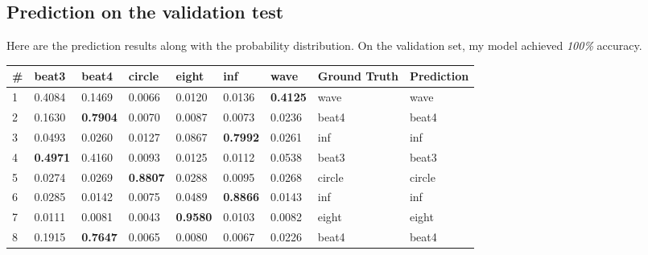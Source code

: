 \documentclass[english]{article}
\begin{document}
\subsection {Prediction on the validation test}
Here are the prediction results along with the probability distribution. On the validation set, my model achieved \emph{100\%} accuracy.\\
\begin{tabular}{|l|l|l|l|l|l|l|l|l|}
\hline
\# & beat3           & beat4           & circle          & eight           & inf             & wave            & Ground Truth & Prediction \\ \hline
1  & 0.4084          & 0.1469          & 0.0066          & 0.0120          & 0.0136          & \textbf{0.4125} & wave         & wave       \\ \hline
2  & 0.1630          & \textbf{0.7904} & 0.0070          & 0.0087          & 0.0073          & 0.0236          & beat4        & beat4      \\ \hline
3  & 0.0493          & 0.0260          & 0.0127          & 0.0867          & \textbf{0.7992} & 0.0261          & inf          & inf        \\ \hline
4  & \textbf{0.4971} & 0.4160          & 0.0093          & 0.0125          & 0.0112          & 0.0538          & beat3        & beat3      \\ \hline
5  & 0.0274          & 0.0269          & \textbf{0.8807} & 0.0288          & 0.0095          & 0.0268          & circle       & circle     \\ \hline
6  & 0.0285          & 0.0142          & 0.0075          & 0.0489          & \textbf{0.8866} & 0.0143          & inf          & inf        \\ \hline
7  & 0.0111          & 0.0081          & 0.0043          & \textbf{0.9580} & 0.0103          & 0.0082          & eight        & eight      \\ \hline
8  & 0.1915          & \textbf{0.7647} & 0.0065          & 0.0080          & 0.0067          & 0.0226          & beat4        & beat4      \\ \hline
\end{tabular}
\end{document}
